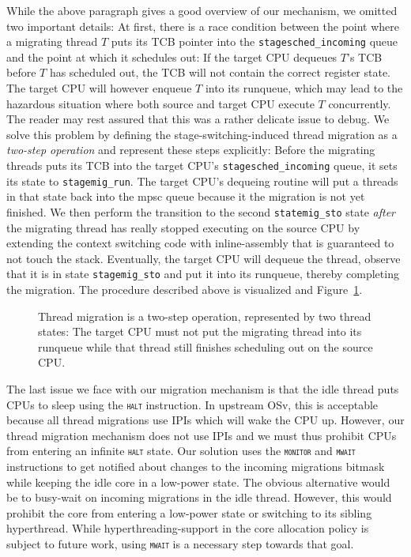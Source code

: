 \documentclass[12pt,a4paper]{book}
\begin{document}
While the above paragraph gives a good overview of our mechanism, we omitted two important details:
At first, there is a race condition between the point where a migrating thread $T$ puts its TCB pointer into the \lstinline[style=figurecpp]{stagesched_incoming} queue and the point at which it schedules out:
If the target CPU dequeues $T$'s TCB before $T$ has scheduled out, the TCB will not contain the correct register state.
The target CPU will however enqueue $T$ into its runqueue, which may lead to the hazardous situation where both source and target CPU execute $T$ concurrently.
The reader may rest assured that this was a rather delicate issue to debug.
We solve this problem by defining the stage-switching-induced thread migration as a \emph{two-step operation} and represent these steps explicitly:
Before the migrating threads puts its TCB into the target CPU's \lstinline[style=figurecpp]{stagesched_incoming} queue, it sets its state to \lstinline[style=figurecpp]{stagemig_run}.
The target CPU's dequeing routine will put a threads in that state back into the mpsc queue because it the migration is not yet finished.
We then perform the transition to the second \lstinline[style=figurecpp]{statemig_sto} state \emph{after} the migrating thread has really stopped executing on the source CPU by extending the context switching code with inline-assembly that is guaranteed to not touch the stack.
Eventually, the target CPU will dequeue the thread, observe that it is in state \lstinline[style=figurecpp]{stagemig_sto} and put it into its runqueue, thereby completing the migration.
The procedure described above is visualized and Figure~\ref{fig:di:mig:race}.

\begin{figure}[H]
    \caption{Thread migration is a two-step operation, represented by two thread states: The target CPU must not put the migrating thread into its runqueue while that thread still finishes scheduling out on the source CPU.}
    \label{fig:di:mig:race}
\end{figure}

The last issue we face with our migration mechanism is that the idle thread puts CPUs to sleep using the \textsc{\texttt{halt}} instruction.
In upstream OSv, this is acceptable because all thread migrations use IPIs which will wake the CPU up.
However, our thread migration mechanism does not use IPIs and we must thus prohibit CPUs from entering an infinite \textsc{\texttt{halt}} state.
Our solution uses the \textsc{\texttt{monitor}} and \textsc{\texttt{mwait}} instructions to get notified about changes to the incoming migrations bitmask while keeping the idle core in a low-power state. 
The obvious alternative would be to busy-wait on incoming migrations in the idle thread.
However, this would prohibit the core from entering a low-power state or switching to its sibling hyperthread.
While hyperthreading-support in the core allocation policy is subject to future work,  using \textsc{\texttt{mwait}} is a necessary step towards that goal.
\end{document}
